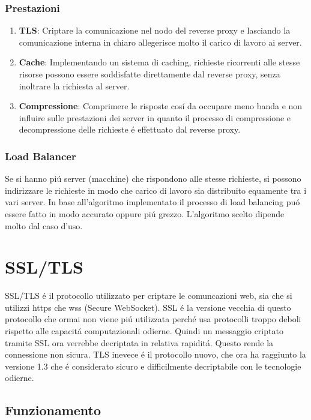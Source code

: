\subsubsection{Prestazioni}
\begin{enumerate}
  \item \textbf{TLS}: Criptare la comunicazione nel nodo del reverse proxy e lasciando la comunicazione interna in chiaro allegerisce molto il carico di lavoro ai server.
  \item \textbf{Cache}: Implementando un sistema di caching, richieste ricorrenti alle stesse risorse possono essere soddisfatte direttamente dal reverse proxy, senza inoltrare la richiesta al server.
  \item \textbf{Compressione}: Comprimere le risposte cosí da occupare meno banda e non influire sulle prestazioni dei server in quanto il processo di compressione e decompressione delle richieste é effettuato dal reverse proxy.
\end{enumerate}

\subsubsection{Load Balancer}
Se si hanno piú server (macchine) che rispondono alle stesse richieste, si possono indirizzare le richieste in modo che carico di lavoro sia distribuito equamente tra i vari server. In base all'algoritmo implementato il processo di load balancing puó essere fatto in modo accurato oppure piú grezzo. L'algoritmo scelto dipende molto dal caso d'uso.

\section{SSL/TLS}
SSL/TLS é il protocollo utilizzato per criptare le comuncazioni web, sia che si utilizzi https che wss (Secure WebSocket). SSL é la versione vecchia di questo protocollo che ormai non viene piú utilizzata perché usa protocolli troppo deboli rispetto alle capacitá computazionali odierne. Quindi un messaggio criptato tramite SSL ora verrebbe decriptata in relativa rapiditá. Questo rende la connessione non sicura. TLS inevece é il protocollo nuovo, che ora ha raggiunto la versione 1.3 che é considerato sicuro e difficilmente decriptabile con le tecnologie odierne.
\subsection{Funzionamento}
